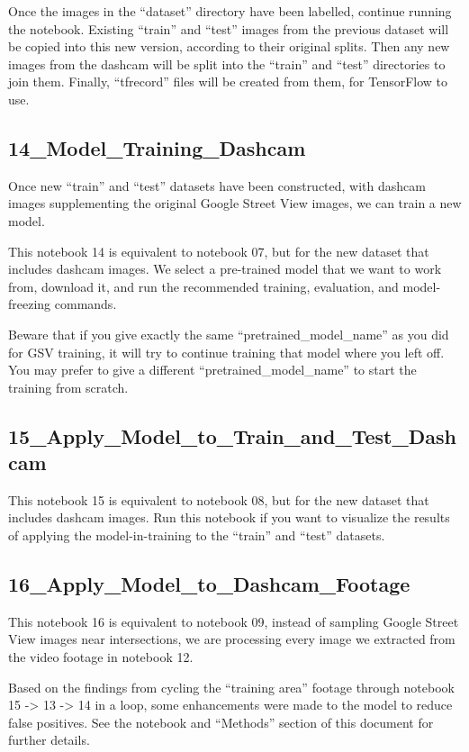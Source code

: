 \documentclass[11pt,twoside]{report}
\begin{document}
Once the images in the ``dataset'' directory have been labelled, continue running the notebook.  Existing ``train'' and ``test'' images from the previous dataset will be copied into this new version, according to their original splits.  Then any new images from the dashcam will be split into the ``train'' and ``test'' directories to join them.  Finally, ``tfrecord'' files will be created from them, for TensorFlow to use.


\subsection{14\_Model\_Training\_Dashcam}
\label{a14}

Once new ``train'' and ``test'' datasets have been constructed, with dashcam images supplementing the original Google Street View images, we can train a new model.

This notebook 14 is equivalent to notebook 07, but for the new dataset that includes dashcam images.  We select a pre-trained model that we want to work from, download it, and run the recommended training, evaluation, and model-freezing commands.

Beware that if you give exactly the same ``pretrained\_model\_name'' as you did for GSV training, it will try to continue training that model where you left off.  You may prefer to give a different ``pretrained\_model\_name'' to start the training from scratch.


\subsection{15\_Apply\_Model\_to\_Train\_and\_Test\_Dashcam}
\label{a15}

This notebook 15 is equivalent to notebook 08, but for the new dataset that includes dashcam images.  Run this notebook if you want to visualize the results of applying the model-in-training to the ``train'' and ``test'' datasets.


\subsection{16\_Apply\_Model\_to\_Dashcam\_Footage}
\label{a16}

This notebook 16 is equivalent to notebook 09, instead of sampling Google Street View images near intersections, we are processing every image we extracted from the video footage in notebook 12.

Based on the findings from cycling the ``training area'' footage through notebook 15 -> 13 -> 14 in a loop, some enhancements were made to the model to reduce false positives.  See the notebook and ``Methods'' section of this document for further details.
\end{document}
